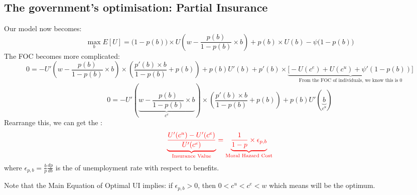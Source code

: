     \subsection{The government's optimisation: Partial Insurance}
        Our model now becomes:
        $$\max_b E[U] = \big(1-p(b)\big)\times{U\left(w-\frac{p(b)}{1-p(b)}\times{b}\right)} + p(b)\times{U(b)} - \psi\big(1-p(b)\big)$$
        The FOC becomes more complicated:
        $$0 = -U'\left( w-\frac{p(b)}{1-p(b)}\times{b} \right)\times{\left(\frac{p'(b)\times{b}}{1-p(b)}+p(b)\right)} + p(b)U'(b) + p'(b)\times\underbrace{\big[-U(c^e)+U(c^u)+\psi'(1-p(b))\big]}_{\text{From\ the\ FOC\ of\ individuals,\ we\ know\ this\ is\ 0}}$$
        $$0 = -U'\left(\underbrace{ w-\frac{p(b)}{1-p(b)}\times{b} }_{c^e}\right)\times{\left(\frac{p'(b)\times{b}}{1-p(b)}+p(b)\right)} + p(b)U'(\underbrace{b}_{c^u})$$
        Rearrange this, we can get the :
        \begin{equation}
            \label{eqn:ui_mh_main}
            \color{red}
            \underbrace{\frac{U'(c^u)-U'(c^e)}{U'(c^e)}}_{\text{Insurance\ Value}} = \underbrace{\frac{1}{1-p}\times{\epsilon_{p,b}}}_{\text{Moral\ Hazard\ Cost}}
        \end{equation}
        where $\epsilon_{p,b} = \frac{b}{p}\frac{dp}{db}$ is the  of unemployment rate with respect to benefits.
        
        Note that the Main Equation of Optimal UI implies: if $\epsilon_{p,b}>0$, then $0<c^u<c^e<w$ which means  will be the optimum.
        
